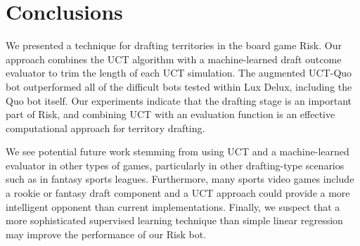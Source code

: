 \documentclass[letterpaper]{article}
\numberwithin{equation}{section}
\numberwithin{theorem}{section}
\numberwithin{lemma}{section}
\numberwithin{df}{section}
\begin{document}
\section{Conclusions}



We presented a technique for drafting territories in the board game Risk.  Our approach combines the UCT algorithm with a machine-learned draft outcome evaluator to trim the length of each UCT simulation.  The augmented UCT-Quo bot outperformed all of the difficult bots tested within Lux Delux, including the Quo bot itself.  Our experiments indicate that the drafting stage is an important part of Risk, and combining UCT with an evaluation function is an effective computational approach for territory drafting. 

We see potential future work stemming from using UCT and a machine-learned evaluator in other types of games, particularly in other drafting-type scenarios such as in fantasy sports leagues.  Furthermore, many sports video games include a rookie or fantasy draft component and a UCT approach could provide a more intelligent opponent than current implementations.  Finally, we suspect that a more sophisticated supervised learning technique than simple linear regression may improve the performance of our Risk bot.  


%
%


\end{document}
